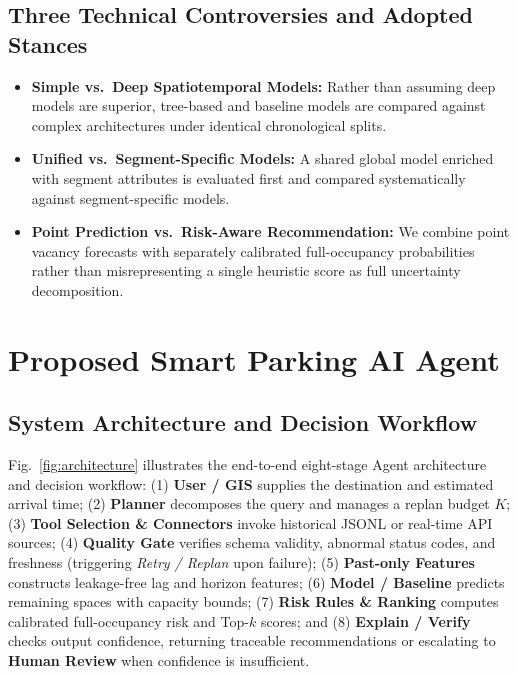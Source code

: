 \documentclass[conference,a4paper]{IEEEtran}
\begin{document}
\subsection{Three Technical Controversies and Adopted Stances}
\begin{itemize}
    \item \textbf{Simple vs.\ Deep Spatiotemporal Models:} Rather than assuming deep models are superior, tree-based and baseline models are compared against complex architectures under identical chronological splits.
    \item \textbf{Unified vs.\ Segment-Specific Models:} A shared global model enriched with segment attributes is evaluated first and compared systematically against segment-specific models.
    \item \textbf{Point Prediction vs.\ Risk-Aware Recommendation:} We combine point vacancy forecasts with separately calibrated full-occupancy probabilities rather than misrepresenting a single heuristic score as full uncertainty decomposition.
\end{itemize}

\section{Proposed Smart Parking AI Agent}\label{sec:method}

\subsection{System Architecture and Decision Workflow}
Fig.~\ref{fig:architecture} illustrates the end-to-end eight-stage Agent architecture and decision workflow: (1) \textbf{User / GIS} supplies the destination and estimated arrival time; (2) \textbf{Planner} decomposes the query and manages a replan budget $K$; (3) \textbf{Tool Selection \& Connectors} invoke historical JSONL or real-time API sources; (4) \textbf{Quality Gate} verifies schema validity, abnormal status codes, and freshness (triggering \textit{Retry / Replan} upon failure); (5) \textbf{Past-only Features} constructs leakage-free lag and horizon features; (6) \textbf{Model / Baseline} predicts remaining spaces with capacity bounds; (7) \textbf{Risk Rules \& Ranking} computes calibrated full-occupancy risk and Top-$k$ scores; and (8) \textbf{Explain / Verify} checks output confidence, returning traceable recommendations or escalating to \textbf{Human Review} when confidence is insufficient.
\end{document}
